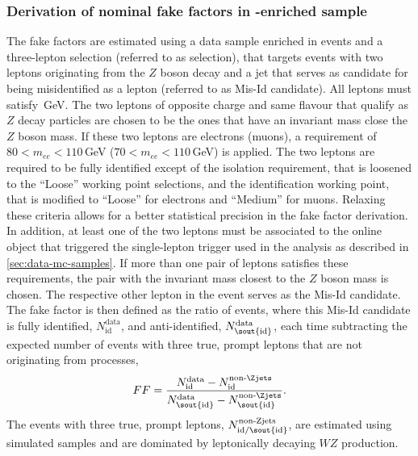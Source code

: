 \subsubsection{Derivation of nominal fake factors in \Zjets-enriched sample}
\label{subsubsec:zjets-ffs}
The fake factors are estimated using a data sample enriched in \Zjets events and a three-lepton selection (referred to as \Zjets selection), that targets events with two leptons originating from the $Z$ boson decay and a jet that serves as candidate for being misidentified as a lepton (referred to as Mis-Id candidate). 
All leptons must satisfy \,GeV.
The two leptons of opposite charge and same flavour that qualify as $Z$ decay particles are chosen to be the ones that have an invariant mass close the $Z$ boson mass. If these two leptons are electrons (muons), a requirement of $80 < m_{ee} < 110\,$GeV ($70 < m_{ee} < 110\,$GeV) is applied.
The two leptons are required to be fully identified except of the isolation requirement, that is loosened to the ``Loose'' working point selections, and the identification working point, that is modified to ``Loose'' for electrons and ``Medium'' for muons.
Relaxing these criteria allows for a better statistical precision in the fake factor derivation.
In addition, at least one of the two leptons must be associated to the online object that triggered the single-lepton trigger used in the analysis as described in \cref{sec:data-mc-samples}.
If more than one pair of leptons satisfies these requirements, the pair with the invariant mass closest to the $Z$ boson mass is chosen.
The respective other lepton in the event serves as the Mis-Id candidate.
The fake factor is then defined as the ratio of events, where this Mis-Id candidate is fully identified, $N_{\text{id}}^{\text{data}}$, and anti-identified, $N_{\text{\sout{id}}}^{\text{data}}$, each time subtracting the expected number of events with three true, prompt leptons that are not originating from \Zjets processes,
\begin{equation}
    \label{eq:ff}
    FF = \frac{ N_{\text{id}}^{\text{data}} - N_{\text{id}}^{\text{non-\Zjets}}}{N_{\text{\sout{id}}}^{\text{data}} - N_{\text{\sout{id}}}^{\text{non-\Zjets}}}.
\end{equation}
The events with three true, prompt leptons, $N_{\text{id/\sout{id}}}^{\text{non-Zjets}}$, are estimated using simulated samples and are dominated by leptonically decaying $WZ$ production. 
